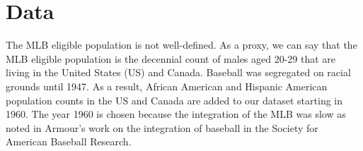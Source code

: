 \documentclass[11pt]{article}\usepackage[]{graphicx}\usepackage[]{color}
\begin{document}


\section{Data}












The MLB eligible population is not well-defined.  As a proxy, we can say 
that the MLB eligible population is the decennial count of males aged 
20-29 that are living in the United States (US) 
and Canada. 
Baseball was segregated on racial grounds until 1947.  As a result, 
African American and Hispanic American population counts in the US  
and Canada are added to our dataset starting in 1960.  The year 1960 is chosen 
because the integration of the MLB was slow as noted in Armour's work on the 
integration of baseball in the Society for American Baseball Research.

\end{document}
